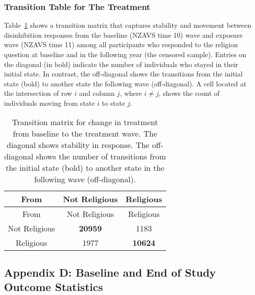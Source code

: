 \documentclass[
  singlecolumn]{article}
\begin{document}
\subsubsection{Transition Table for The
Treatment}\label{transition-table-for-the-treatment}

Table~\ref{tbl-transition} shows a transition matrix that captures
stability and movement between disinhibition responses from the baseline
(NZAVS time 10) wave and exposure wave (NZAVS time 11) among all
participants who responded to the religion question at baseline and in
the following year (the censored sample). Entries on the diagonal (in
bold) indicate the number of individuals who stayed in their initial
state. In contrast, the off-diagonal shows the transitions from the
initial state (bold) to another state the following wave (off-diagonal).
A cell located at the intersection of row \(i\) and column \(j\), where
\(i \neq j\), shows the count of individuals moving from state \(i\) to
state \(j\).

\begin{longtable}[]{@{}ccc@{}}
\caption{Transition matrix for change in treatment from baseline to the
treatment wave. The diagonal shows stability in response. The
off-diagonal shows the number of transitions from the initial state
(bold) to another state in the following wave
(off-diagonal).}\label{tbl-transition}\tabularnewline
\toprule\noalign{}
From & Not Religious & Religious \\
\midrule\noalign{}
\endfirsthead
\toprule\noalign{}
From & Not Religious & Religious \\
\midrule\noalign{}
\endhead
\bottomrule\noalign{}
\endlastfoot
Not Religious & \textbf{20959} & 1183 \\
Religious & 1977 & \textbf{10624} \\
\end{longtable}

\subsection{Appendix D: Baseline and End of Study Outcome
Statistics}\label{appendix-outcomes}
\end{document}
